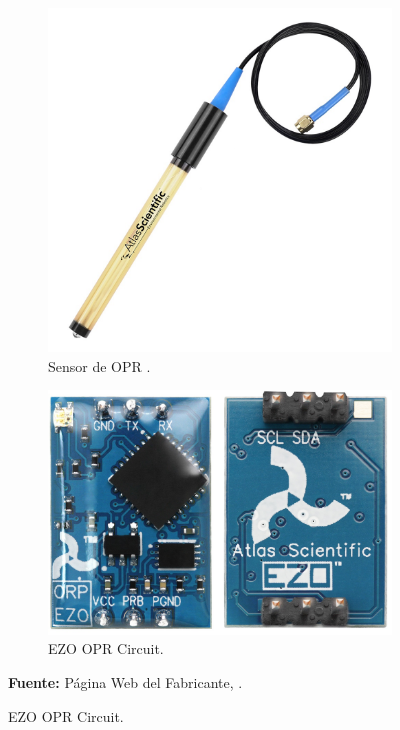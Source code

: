 \begin{figure}[H]
\caption[Sensor y EZO de OPR.]{Sensor y EZO de OPR de la empresa Atlas Scientific. }
     \centering
     \begin{subfigure}[b]{0.5\textwidth}
         \centering
         \includegraphics[width=\textwidth]{Imagenes/cap3/OPR_Sensor.jpg}
	    \caption[Sensor de OPR.]{Sensor de OPR . }
        \label{fig:sensorOPR}
     \end{subfigure}
     \hfill
     \begin{subfigure}[b]{0.35\textwidth}
         \centering
         \includegraphics[width=\textwidth]{Imagenes/cap3/OPR_EZO.jpg}
         \caption[EZO OPR Circuit]{EZO OPR Circuit.}
        \label{fig:EZOOPR}
     \end{subfigure}
\textbf{Fuente:} P\'agina Web del Fabricante, \cite{atlas_ezo_OPR}.
     \hfill
\end{figure}

